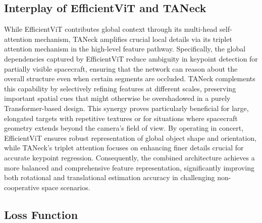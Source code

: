 \documentclass[a4paper,fleqn]{cas-sc}
\begin{document}
\subsection{Interplay of EfficientViT and TANeck}
While EfficientViT contributes global context through its multi-head self-attention mechanism, TANeck amplifies crucial local details via its triplet attention mechanism in the high-level feature pathway. Specifically, the global dependencies captured by EfficientViT reduce ambiguity in keypoint detection for partially visible spacecraft, ensuring that the network can reason about the overall structure even when certain segments are occluded. TANeck complements this capability by selectively refining features at different scales, preserving important spatial cues that might otherwise be overshadowed in a purely Transformer-based design. This synergy proves particularly beneficial for large, elongated targets with repetitive textures or for situations where spacecraft geometry extends beyond the camera's field of view. By operating in concert, EfficientViT ensures robust representation of global object shape and orientation, while TANeck's triplet attention focuses on enhancing finer details crucial for accurate keypoint regression. Consequently, the combined architecture achieves a more balanced and comprehensive feature representation, significantly improving both rotational and translational estimation accuracy in challenging non-cooperative space scenarios.

\subsection{Loss Function}
\end{document}
